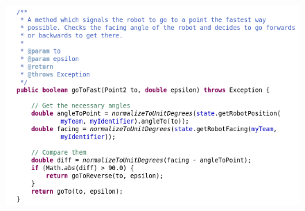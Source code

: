 \documentclass[a4paper,11pt]{article}
\begin{document}
\begin{figure}[ht!]
\centering
\includegraphics[width=130mm]{strategy-example.png}
\end{figure}
\end{document}
